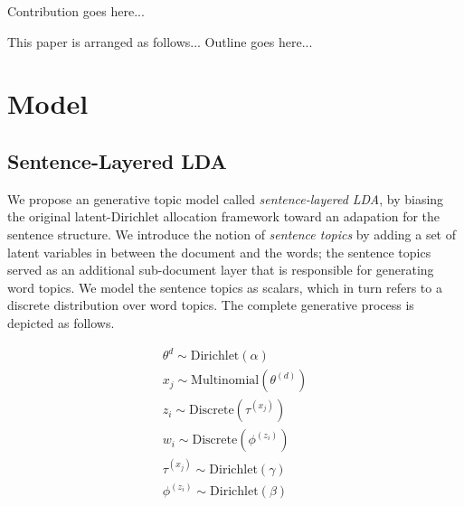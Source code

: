 {\color{red} Contribution goes here...}

This paper is arranged as follows... {\color{red} Outline goes here...}

\section{Model}
\subsection{Sentence-Layered LDA}

We propose an generative topic model called {\it sentence-layered LDA}, by
biasing the original latent-Dirichlet allocation framework toward an adapation
{for} the sentence structure.  We introduce the notion of {\it sentence
topics} by adding a set of latent variables in between the document and the
words; the sentence topics served as an additional sub-document layer that is
responsible for generating word topics.  We model the sentence topics as
scalars, which in turn refers to a discrete distribution over word topics.  The
complete generative process is depicted as follows.

\begin{eqnarray*}
  \theta^{d} \sim \mathrm{Dirichlet}(\alpha) \\
  x_j \sim \mathrm{Multinomial}(\theta^{(d)}) \\
  z_i \sim \mathrm{Discrete}(\tau^{(x_j)}) \\
  w_i \sim \mathrm{Discrete}(\phi^{(z_i)}) \\
  \tau^{(x_j)} \sim \mathrm{Dirichlet}(\gamma) \\
  \phi^{(z_i)} \sim \mathrm{Dirichlet}(\beta) 
\end{eqnarray*}


